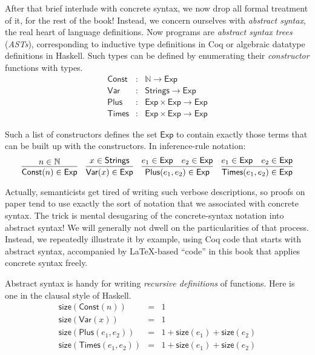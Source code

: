 \documentclass{amsbook}
\theoremstyle{definition}
\theoremstyle{remark}
\numberwithin{section}{chapter}
\numberwithin{equation}{chapter}
\begin{document}
After that brief interlude with concrete syntax, we now drop all formal treatment of it, for the rest of the book!
Instead, we concern ourselves with \emph{abstract syntax}, the real heart of language definitions.
Now programs are \emph{abstract syntax trees} (\emph{ASTs}), corresponding to inductive type definitions in Coq or algebraic datatype definitions in Haskell.
Such types can be defined by enumerating their \emph{constructor} functions with types.
\encoding
\begin{eqnarray*}
  \mathsf{Const} &:& \mathbb{N} \to \mathsf{Exp} \\
  \mathsf{Var} &:& \mathsf{Strings} \to \mathsf{Exp} \\
  \mathsf{Plus} &:& \mathsf{Exp} \times \mathsf{Exp} \to \mathsf{Exp} \\
  \mathsf{Times} &:& \mathsf{Exp} \times \mathsf{Exp} \to \mathsf{Exp}
\end{eqnarray*}

Such a list of constructors defines the set $\mathsf{Exp}$ to contain exactly those terms that can be built up with the constructors.
In inference-rule notation:
\encoding
$$\infer{\mathsf{Const}(n) \in \mathsf{Exp}}{
  n \in \mathbb N
}
\quad \infer{\mathsf{Var}(x) \in \mathsf{Exp}}{
  x \in \mathsf{Strings}
}
\quad \infer{\mathsf{Plus}(e_1, e_2) \in \mathsf{Exp}}{
  e_1 \in \mathsf{Exp}
  & e_2 \in \mathsf{Exp}
}
\quad \infer{\mathsf{Times}(e_1, e_2) \in \mathsf{Exp}}{
  e_1 \in \mathsf{Exp}
  & e_2 \in \mathsf{Exp}
}$$

Actually, semanticists get tired of writing such verbose descriptions, so proofs on paper tend to use exactly the sort of notation that we associated with concrete syntax.
The trick is mental desugaring of the concrete-syntax notation into abstract syntax!
We will generally not dwell on the particularities of that process.
Instead, we repeatedly illustrate it by example, using Coq code that starts with abstract syntax, accompanied by \LaTeX{}-based ``code'' in this book that applies concrete syntax freely.

Abstract syntax is handy for writing \emph{recursive definitions} of functions.
Here is one in the clausal style of Haskell.
\begin{eqnarray*}
  \mathsf{size}(\mathsf{Const}(n)) &=& 1 \\
  \mathsf{size}(\mathsf{Var}(x)) &=& 1 \\
  \mathsf{size}(\mathsf{Plus}(e_1, e_2)) &=& 1 + \mathsf{size}(e_1) + \mathsf{size}(e_2) \\
  \mathsf{size}(\mathsf{Times}(e_1, e_2)) &=& 1 + \mathsf{size}(e_1) + \mathsf{size}(e_2)
\end{eqnarray*}
\end{document}
